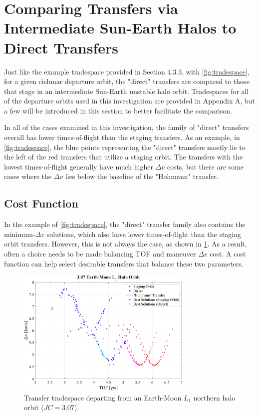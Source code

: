 \section{Comparing Transfers via Intermediate Sun-Earth Halos to Direct Transfers}
Just like the example tradespace provided in Section 4.3.3, with \cref{fig:tradespace}, for a given
cislunar departure orbit, the "direct" transfers are compared to those that stage in an
intermediate Sun-Earth unstable halo orbit. Tradespaces for all of the departure orbits used in
this investigation are provided in Appendix A, but a few will be introduced in this section to
better facilitate the comparison.

In all of the cases examined in this investigation, the family of "direct" transfers overall has
lower times-of-flight than the staging transfers. As an example, in \cref{fig:tradespace}, the blue
points representing the "direct" transfers mostly lie to the left of the red transfers that utilize
a staging orbit. The transfers with the lowest times-of-flight generally have much higher
$\Delta v$ costs, but there are some cases where the $\Delta v$ lies below the baseline of the
"Hohmann" transfer.

\subsection{Cost Function}
In the example of \cref{fig:tradespace}, the "direct" transfer family also contains the
minimum-$\Delta v$ solutions, which also have lower times-of-flight than the staging orbit
transfers. However, this is not always the case, as shown in \cref{fig:lowDeltav}. As a result,
often a choice needs to be made balancing TOF and maneuver $\Delta v$ cost. A cost function can
help select desirable transfers that balance these two parameters.

\begin{figure}[ht]
    \centering
    \includegraphics[width=0.75\textwidth]{figures/TradeSpace_L1Halo_3_07.pdf}
    \caption{Transfer tradespace departing from an Earth-Moon $L_{1}$ northern halo orbit ($JC=3.07$).}
    \label{fig:lowDeltav}
\end{figure}

